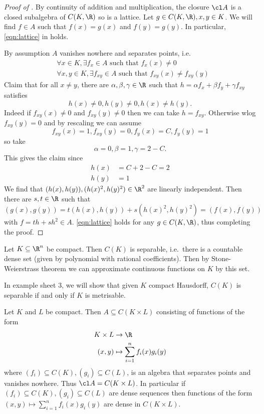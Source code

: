 \documentclass[a4paper]{article}
\begin{document}
\begin{proof}[Proof of ]
  By continuity of addition and multiplication, the closure \(\cl A\) is a closed subalgebra of \(C(K, \R)\) so is a lattice. Let \(g \in C(K, \R), x, y \in K\). We will find \(f \in A\) such that \(f(x) = g(x)\) and \(f(y) = g(y)\). In particular, \eqref{eqn:lattice} in  holds.

  By assumption \(A\) vanishes nowhere and separates points, i.e.\
  \begin{align*}
    & \forall x \in K, \exists f_x \in A \text{ such that } f_x(x) \neq 0 \\
    & \forall x, y \in K, \exists f_{xy} \in A \text{ such that } f_{xy}(x) \neq f_{xy}(y)
  \end{align*}
  Claim that for all \(x \neq y\), there are \(\alpha, \beta, \gamma \in \R\) such that \(h = \alpha f_x + \beta f_y + \gamma f_{xy}\) satisfies
  \[
    h(x) \neq 0, h(y) \neq 0, h(x) \neq h(y).
  \]
  Indeed if \(f_{xy}(x) \neq 0\) and \(f_{xy}(y) \neq 0\) then we can take \(h = f_{xy}\). Otherwise wlog \(f_{xy}(y) = 0\) and by rescaling we can assume
  \[
    f_{xy}(x) = 1, f_{xy}(y) = 0, f_y(x) = C, f_y(y) = 1
  \]
  so take
  \[
    \alpha = 0, \beta = 1, \gamma = 2 - C.
  \]
  This gives the claim since
  \begin{align*}
    h(x) &= C + 2 - C = 2 \\
    h(y) &= 1
  \end{align*}
  We find that \((h(x), h(y)), (h(x)^2, h(y)^2) \in \R^2\) are linearly independent. Then there are \(s, t \in \R\) such that
  \[
    (g(x), g(y)) = t (h(x), h(y)) + s (h(x)^2, h(y)^2) = (f(x), f(y))
  \]
  with \(f = th + sh^2 \in A\). \eqref{eqn:lattice} holds for any \(g \in C(K, \R)\), thus completing the proof.
\end{proof}

\begin{eg}
  Let \(K \subseteq \R^n\) be compact. Then \(C(K)\) is separable, i.e.\ there is a countable dense set (given by polynomial with rational coefficients). Then by Stone-Weierstrass theorem we can approximate continuous functions on \(K\) by this set.

  In example sheet 3, we will show that given \(K\) compact Hausdorff, \(C(K)\) is separable if and only if \(K\) is metrisable.
\end{eg}

\begin{eg}
  Let \(K\) and \(L\) be compact. Then \(A \subseteq C(K \times L)\) consisting of functions of the form
  \begin{align*}
    K \times L &\to \R \\
    (x, y) &\mapsto \sum_{i = 1}^n f_i(x) g_i(y)
  \end{align*}
  where \((f_i) \subseteq C(K), (g_i) \subseteq C(L)\), is an algebra that separates points and vanishes nowhere. Thus \(\cl A = C(K \times L)\). In particular if \((f_i) \subseteq C(K), (g_i) \subseteq C(L)\) are dense sequences then functions of the form \((x, y) \mapsto \sum_{i = 1}^n f_i(x)g_i(y)\) are dense in \(C(K \times L)\).
\end{eg}
\end{document}
